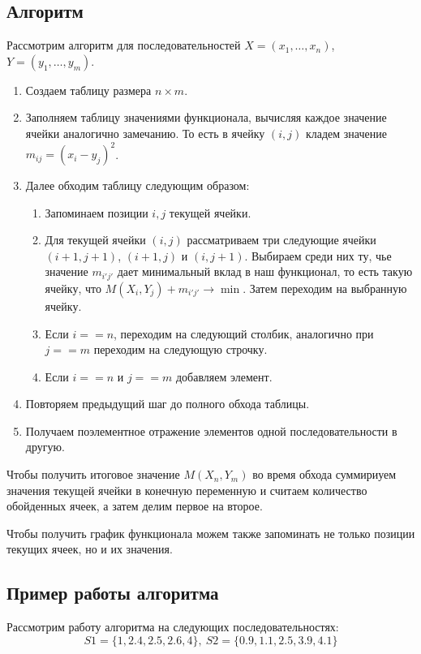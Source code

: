 \documentclass[12pt]{article}
\begin{document}
    \subsection{Алгоритм}
    Рассмотрим алгоритм для последовательностей $X = (x_1,\ldots,x_n)$,
    $Y=(y_1,\ldots,y_m)$.

    \begin{enumerate}
        \item Создаем таблицу размера $n\times m$.
        \item Заполняем таблицу значениями функционала,
            вычисляя каждое значение ячейки аналогично замечанию.
            То есть в ячейку $(i, j)$ кладем значение $m_{ij} = (x_{i} - y_{j})^2$.
        \item Далее обходим таблицу следующим образом:
            \begin{enumerate}
                \item Запоминаем позиции $i,j$ текущей ячейки.
                \item Для текущей ячейки $(i, j)$ рассматриваем три следующие ячейки
                $(i+1,j+1)$, $(i+1,j)$ и $(i,j+1)$. Выбираем среди них ту,
                чье значение $m_{i'j'}$ дает минимальный вклад в наш функционал, то есть такую
                ячейку, что $M(X_i, Y_j) + m_{i'j'}\rightarrow \min$. Затем
                переходим на выбранную ячейку.
                \item Если $i == n$, переходим на
                следующий столбик, аналогично при $j == m$ переходим на следующую строчку.
                \item Если $i == n$ и $j == m$ добавляем элемент.
            \end{enumerate}
        \item Повторяем предыдущий шаг до полного обхода таблицы.
        \item Получаем поэлементное отражение элементов одной последовательности в другую.
    \end{enumerate}

    Чтобы получить итоговое значение $M(X_n, Y_m)$ во время обхода
    суммириуем значения текущей ячейки в конечную переменную и считаем
    количество обойденных ячеек, а затем делим первое на второе.

    Чтобы получить график функционала можем также запоминать не только
    позиции текущих ячеек, но и их значения.

\subsection{Пример работы алгоритма}
    Рассмотрим работу алгоритма на следующих последовательностях:
    \[ S1 = \{1, 2.4, 2.5, 2.6, 4\},\ S2 = \{0.9, 1.1, 2.5, 3.9, 4.1\} \]
\end{document}
